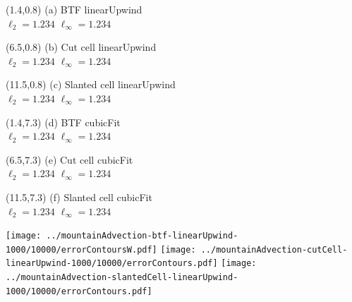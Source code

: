 \documentclass{article}
\begin{document}
\TPMargin{1pt}
\begin{textblock}{4}(1.4,0.8)
\normalsize
(a) BTF linearUpwind \\
\hspace*{1em}$\ell_2 = \num{1.234}$
\hspace*{1em}$\ell_\infty = \num{1.234}$
\end{textblock}
\begin{textblock}{4}(6.5,0.8)
\normalsize
(b) Cut cell linearUpwind \\
\hspace*{1em}$\ell_2 = \num{1.234}$
\hspace*{1em}$\ell_\infty = \num{1.234}$
\end{textblock}
\begin{textblock}{4}(11.5,0.8)
\normalsize
(c) Slanted cell linearUpwind \\
\hspace*{1em}$\ell_2 = \num{1.234}$
\hspace*{1em}$\ell_\infty = \num{1.234}$
\end{textblock}
\begin{textblock}{4}(1.4,7.3)
\normalsize
(d) BTF cubicFit \\
\hspace*{1em}$\ell_2 = \num{1.234}$
\hspace*{1em}$\ell_\infty = \num{1.234}$
\end{textblock}
\begin{textblock}{4}(6.5,7.3)
\normalsize
(e) Cut cell cubicFit \\
\hspace*{1em}$\ell_2 = \num{1.234}$
\hspace*{1em}$\ell_\infty = \num{1.234}$
\end{textblock}
\begin{textblock}{4}(11.5,7.3)
\normalsize
(f) Slanted cell cubicFit \\
\hspace*{1em}$\ell_2 = \num{1.234}$
\hspace*{1em}$\ell_\infty = \num{1.234}$
\end{textblock}
\texttt{[image: ../mountainAdvection-btf-linearUpwind-1000/10000/errorContoursW.pdf]}
\hspace*{0.35em}
\texttt{[image: ../mountainAdvection-cutCell-linearUpwind-1000/10000/errorContours.pdf]}
\hspace*{0.35em}
\texttt{[image: ../mountainAdvection-slantedCell-linearUpwind-1000/10000/errorContours.pdf]} \\
\end{document}
